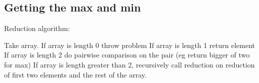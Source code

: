 
\subsection{Getting the max and min}

Reduction algorithm:

Take array. If array is length 0 throw problem
If array is length 1 return element
If array is length 2 do pairwise comparison on the pair (eg return bigger of two for max)
If array is length greater than 2, recursively call reduction on reduction of first two elements and the rest of the array.

